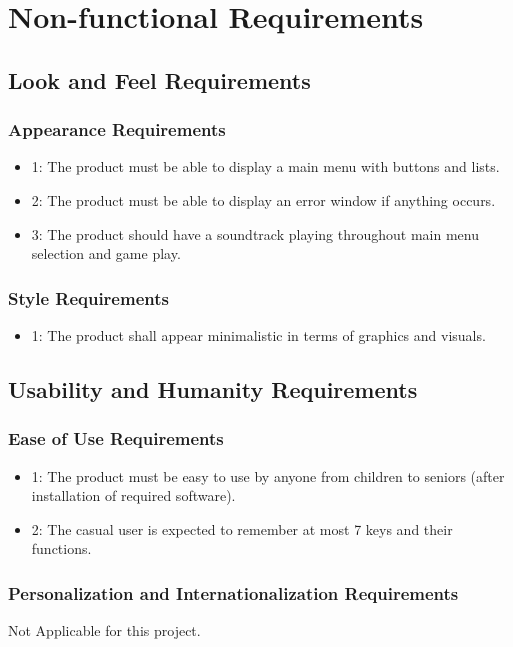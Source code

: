 \documentclass[12pt]{article}
\begin{document}
\section*{Non-functional Requirements}

\subsection{Look and Feel Requirements}
\subsubsection*{Appearance Requirements}
\begin{itemize}
\item 1: The product must be able to display a main menu with buttons and lists.
\item 2: The product must be able to display an error window if anything occurs.
\item 3: The product should have a soundtrack playing throughout main menu selection and game play.
\end{itemize}

\subsubsection*{Style Requirements}
\begin{itemize}
\item 1: The product shall appear minimalistic in terms of graphics and visuals.
\end{itemize}

\subsection{Usability and Humanity Requirements}
\subsubsection*{Ease of Use Requirements}
\begin{itemize}
\item 1: The product must be easy to use by anyone from children to seniors (after installation of required software).
\item 2:  The casual user is expected to remember at most 7 keys and their functions.
\end{itemize}

\subsubsection*{Personalization and Internationalization Requirements}
Not Applicable for this project.
\end{document}
